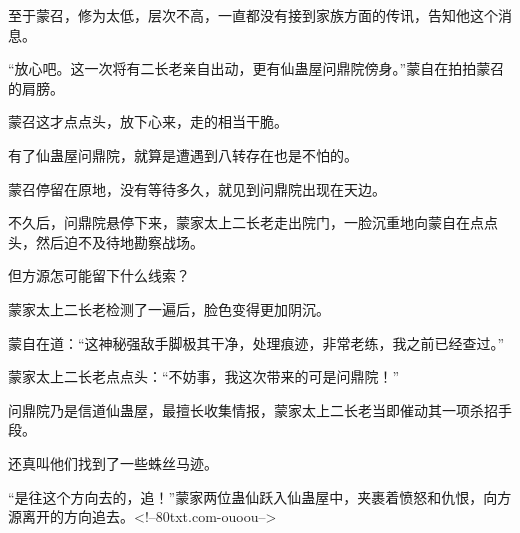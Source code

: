 \begin{this_body}
至于蒙召，修为太低，层次不高，一直都没有接到家族方面的传讯，告知他这个消息。

“放心吧。这一次将有二长老亲自出动，更有仙蛊屋问鼎院傍身。”蒙自在拍拍蒙召的肩膀。

蒙召这才点点头，放下心来，走的相当干脆。

有了仙蛊屋问鼎院，就算是遭遇到八转存在也是不怕的。

蒙召停留在原地，没有等待多久，就见到问鼎院出现在天边。

不久后，问鼎院悬停下来，蒙家太上二长老走出院门，一脸沉重地向蒙自在点点头，然后迫不及待地勘察战场。

但方源怎可能留下什么线索？

蒙家太上二长老检测了一遍后，脸色变得更加阴沉。

蒙自在道：“这神秘强敌手脚极其干净，处理痕迹，非常老练，我之前已经查过。”

蒙家太上二长老点点头：“不妨事，我这次带来的可是问鼎院！”

问鼎院乃是信道仙蛊屋，最擅长收集情报，蒙家太上二长老当即催动其一项杀招手段。

还真叫他们找到了一些蛛丝马迹。

“是往这个方向去的，追！”蒙家两位蛊仙跃入仙蛊屋中，夹裹着愤怒和仇恨，向方源离开的方向追去。<!--80txt.com-ouoou-->

\end{this_body}


